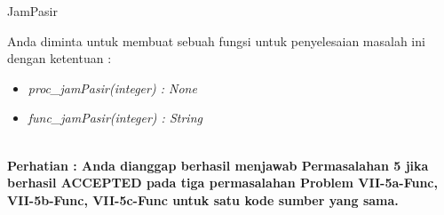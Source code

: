 \begin{permasalahan}{JamPasir}
	
	Anda diminta untuk membuat sebuah fungsi untuk penyelesaian masalah ini dengan ketentuan : \\
	\begin{itemize}
		\item \textit{proc\_jamPasir(integer) : None}\\
		\item \textit{func\_jamPasir(integer) : String}\\\\
	\end{itemize}

	
	\textbf{Perhatian : Anda dianggap berhasil menjawab Permasalahan 5 jika berhasil ACCEPTED pada tiga permasalahan Problem VII-5a-Func, VII-5b-Func, VII-5c-Func untuk satu kode sumber yang sama.}
		
		
	
\end{permasalahan}




